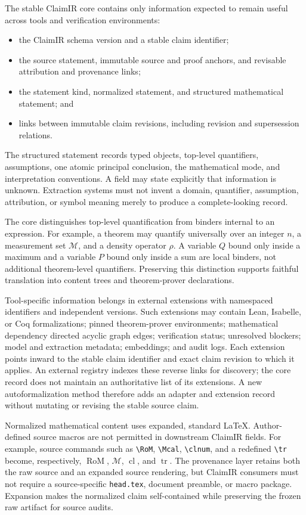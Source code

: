 The stable ClaimIR core contains only information expected to remain useful across tools and verification environments:
\begin{itemize}[leftmargin=*]
    \item the ClaimIR schema version and a stable claim identifier;
    \item the source statement, immutable source and proof anchors, and revisable attribution and provenance links;
    \item the statement kind, normalized statement, and structured mathematical statement; and
    \item links between immutable claim revisions, including revision and supersession relations.
\end{itemize}
The structured statement records typed objects, top-level quantifiers, assumptions, one atomic principal conclusion, the mathematical mode, and interpretation conventions. A field may state explicitly that information is unknown. Extraction systems must not invent a domain, quantifier, assumption, attribution, or symbol meaning merely to produce a complete-looking record.

The core distinguishes top-level quantification from binders internal to an expression. For example, a theorem may quantify universally over an integer $n$, a measurement set $\mathcal{M}$, and a density operator $\rho$. A variable $Q$ bound only inside a maximum and a variable $P$ bound only inside a sum are local binders, not additional theorem-level quantifiers. Preserving this distinction supports faithful translation into content trees and theorem-prover declarations.

Tool-specific information belongs in external extensions with namespaced identifiers and independent versions. Such extensions may contain Lean, Isabelle, or Coq formalizations; pinned theorem-prover environments; mathematical dependency directed acyclic graph edges; verification status; unresolved blockers; model and extraction metadata; embeddings; and audit logs. Each extension points inward to the stable claim identifier and exact claim revision to which it applies. An external registry indexes these reverse links for discovery; the core record does not maintain an authoritative list of its extensions. A new autoformalization method therefore adds an adapter and extension record without mutating or revising the stable source claim.

Normalized mathematical content uses expanded, standard \LaTeX{}. Author-defined source macros are not permitted in downstream ClaimIR fields. For example, source commands such as \verb|\RoM|, \verb|\Mcal|, \verb|\clnum|, and a redefined \verb|\tr| become, respectively, $\operatorname{RoM}$, $\mathcal{M}$, $\operatorname{cl}$, and $\operatorname{tr}$. The provenance layer retains both the raw source and an expanded source rendering, but ClaimIR consumers must not require a source-specific \texttt{head.tex}, document preamble, or macro package. Expansion makes the normalized claim self-contained while preserving the frozen raw artifact for source audits.

